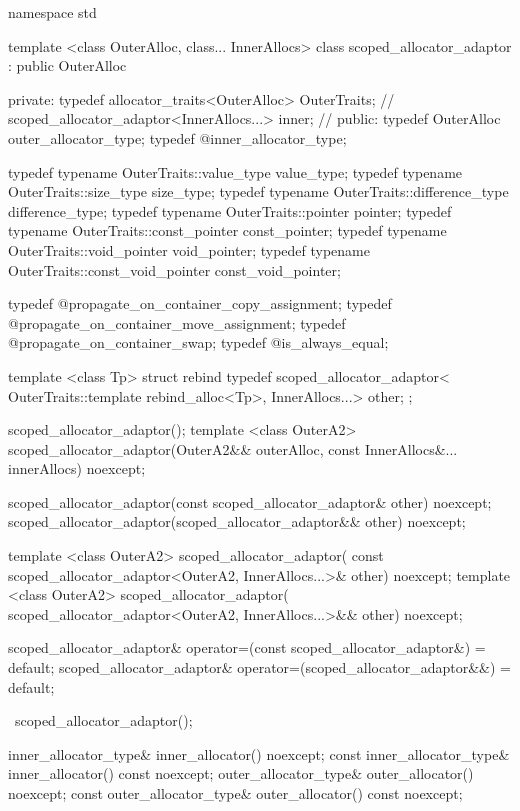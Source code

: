 \begin{codeblock}
namespace std {
  template <class OuterAlloc, class... InnerAllocs>
    class scoped_allocator_adaptor : public OuterAlloc {
  private:
    typedef allocator_traits<OuterAlloc> OuterTraits; // \expos
    scoped_allocator_adaptor<InnerAllocs...> inner;   // \expos
  public:
    typedef OuterAlloc outer_allocator_type;
    typedef @\seebelow@ inner_allocator_type;

    typedef typename OuterTraits::value_type value_type;
    typedef typename OuterTraits::size_type size_type;
    typedef typename OuterTraits::difference_type difference_type;
    typedef typename OuterTraits::pointer pointer;
    typedef typename OuterTraits::const_pointer const_pointer;
    typedef typename OuterTraits::void_pointer void_pointer;
    typedef typename OuterTraits::const_void_pointer const_void_pointer;

    typedef @\seebelow@ propagate_on_container_copy_assignment;
    typedef @\seebelow@ propagate_on_container_move_assignment;
    typedef @\seebelow@ propagate_on_container_swap;
    typedef @\seebelow@ is_always_equal;

    template <class Tp>
      struct rebind {
        typedef scoped_allocator_adaptor<
          OuterTraits::template rebind_alloc<Tp>, InnerAllocs...> other;
      };

    scoped_allocator_adaptor();
    template <class OuterA2>
      scoped_allocator_adaptor(OuterA2&& outerAlloc,
                               const InnerAllocs&... innerAllocs) noexcept;

    scoped_allocator_adaptor(const scoped_allocator_adaptor& other) noexcept;
    scoped_allocator_adaptor(scoped_allocator_adaptor&& other) noexcept;

    template <class OuterA2>
      scoped_allocator_adaptor(
        const scoped_allocator_adaptor<OuterA2, InnerAllocs...>& other) noexcept;
    template <class OuterA2>
      scoped_allocator_adaptor(
        scoped_allocator_adaptor<OuterA2, InnerAllocs...>&& other) noexcept;

    scoped_allocator_adaptor& operator=(const scoped_allocator_adaptor&) = default;
    scoped_allocator_adaptor& operator=(scoped_allocator_adaptor&&) = default;

    ~scoped_allocator_adaptor();

    inner_allocator_type& inner_allocator() noexcept;
    const inner_allocator_type& inner_allocator() const noexcept;
    outer_allocator_type& outer_allocator() noexcept;
    const outer_allocator_type& outer_allocator() const noexcept;

}}
\end{codeblock}
